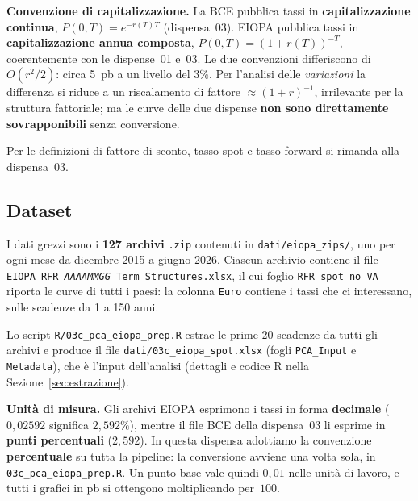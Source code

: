 \documentclass[11pt,a4paper]{article}
\theoremstyle{plain}
\theoremstyle{definition}
\theoremstyle{remark}
\begin{document}
\begin{warningbox}
\textbf{Convenzione di capitalizzazione.}
La BCE pubblica tassi in \textbf{capitalizzazione continua},
$P(0,T)=e^{-r(T)T}$ (dispensa~03). EIOPA pubblica tassi in
\textbf{capitalizzazione annua composta}, $P(0,T)=(1+r(T))^{-T}$,
coerentemente con le dispense~01 e~03. Le due convenzioni differiscono di
$O(r^2/2)$: circa 5~pb a un livello del $3\%$. Per l'analisi delle
\emph{variazioni} la differenza si riduce a un riscalamento di fattore
$\approx(1+r)^{-1}$, irrilevante per la struttura fattoriale; ma le curve
delle due dispense \textbf{non sono direttamente sovrapponibili} senza
conversione.
\end{warningbox}

\noindent Per le definizioni di fattore di sconto, tasso spot e tasso forward si
rimanda alla dispensa~03.

\subsection{Dataset}

I dati grezzi sono i \textbf{127 archivi} \texttt{.zip} contenuti in
\texttt{dati/eiopa\_zips/}, uno per ogni mese da dicembre 2015 a giugno 2026.
Ciascun archivio contiene il file
\texttt{EIOPA\_RFR\_\textit{AAAAMMGG}\_Term\_Structures.xlsx}, il cui foglio
\texttt{RFR\_spot\_no\_VA} riporta le curve di tutti i paesi: la colonna
\texttt{Euro} contiene i tassi che ci interessano, sulle scadenze da 1 a 150
anni.

Lo script \texttt{R/03c\_pca\_eiopa\_prep.R} estrae le prime 20 scadenze da tutti
gli archivi e produce il file \texttt{dati/03c\_eiopa\_spot.xlsx}
(fogli \texttt{PCA\_Input} e \texttt{Metadata}), che \`e l'input dell'analisi
(dettagli e codice R nella Sezione~\ref{sec:estrazione}).

\begin{warningbox}
\textbf{Unit\`a di misura.}
Gli archivi EIOPA esprimono i tassi in forma \textbf{decimale}
($0{,}02592$ significa $2{,}592\%$), mentre il file BCE della dispensa~03 li
esprime in \textbf{punti percentuali} ($2{,}592$). In questa dispensa adottiamo
la convenzione \textbf{percentuale} su tutta la pipeline: la conversione avviene
una volta sola, in \texttt{03c\_pca\_eiopa\_prep.R}. Un punto base vale quindi
$0{,}01$ nelle unit\`a di lavoro, e tutti i grafici in pb si ottengono
moltiplicando per~$100$.
\end{warningbox}

\end{document}
